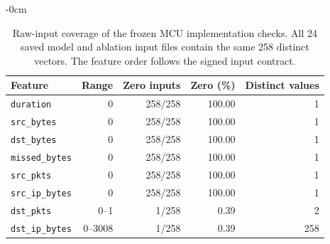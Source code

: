 \begin{table}[H]\begin{adjustwidth}{-\extralength}{0cm}
\caption{Raw-input coverage of the frozen MCU implementation checks. All 24 saved model and ablation input files contain the same 258 distinct vectors. The feature order follows the signed input contract.}
\label{tab:hardware-vector-coverage}
\centering\small
\begin{tabular}{lrrrr}
\toprule
Feature & Range & Zero inputs & Zero (\%) & Distinct values \\
\midrule
\texttt{duration} & 0 & 258/258 & 100.00 & 1 \\
\texttt{src\_bytes} & 0 & 258/258 & 100.00 & 1 \\
\texttt{dst\_bytes} & 0 & 258/258 & 100.00 & 1 \\
\texttt{missed\_bytes} & 0 & 258/258 & 100.00 & 1 \\
\texttt{src\_pkts} & 0 & 258/258 & 100.00 & 1 \\
\texttt{src\_ip\_bytes} & 0 & 258/258 & 100.00 & 1 \\
\texttt{dst\_pkts} & 0--1 & 1/258 & 0.39 & 2 \\
\texttt{dst\_ip\_bytes} & 0--3008 & 1/258 & 0.39 & 258 \\
\bottomrule
\end{tabular}
\end{adjustwidth}\end{table}
